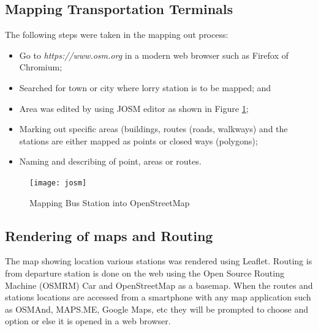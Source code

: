 \subsection{Mapping Transportation Terminals}
The following steps were taken in the mapping out process:
\begin{itemize}
	\item Go to \textit{https://www.osm.org} in a modern web browser such as Firefox of Chromium; 
	\item Searched for town or city where lorry station is to be mapped; and 
	\item Area was edited by using JOSM editor as shown in Figure \ref{fig:josm};
	\item Marking out specific areas (buildings, routes (roads, walkways) and the stations are either mapped as points or closed ways (polygons);  
	\item Naming  and describing of point, areas or routes. 
\end{itemize}

\begin{figure}[H]
	\centering
	\texttt{[image: josm]}
	\caption[Mapping Bus Station into OpenStreetMap]{Mapping Bus Station into OpenStreetMap}
	\label{fig:josm}
\end{figure}

\subsection{Rendering of maps and Routing}
The map showing location various stations was rendered using Leaflet. Routing is from departure station is done on the web using the Open Source Routing Machine (OSMRM) Car and OpenStreetMap as a basemap. When the routes and stations locations are accessed from a smartphone with any map application such as OSMAnd, MAPS.ME, Google Maps, etc they will be prompted to choose and option or else it is opened in a web browser.



